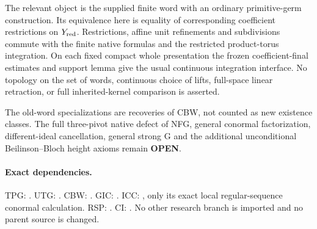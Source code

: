 The relevant object is the supplied finite word with an ordinary
primitive-germ construction.  Its equivalence here is equality
of corresponding coefficient restrictions on $Y_{\rm red}$.
Restrictions, affine unit refinements and subdivisions commute
with the finite native formulas and the restricted product-torus
integration.  On each fixed compact whole presentation the
frozen coefficient-final estimates and support lemma give the
usual continuous integration interface.  No topology on the
set of words, continuous choice of lifts, full-space linear
retraction, or full inherited-kernel comparison is asserted.

The old-word specializations are recoveries of CBW, not counted
as new existence classes.  The full three-pivot native defect
of NFG, general conormal factorization, different-ideal
cancellation, general strong G and the additional unconditional
Beilinson--Bloch height axioms remain \textbf{OPEN}.

\paragraph{Exact dependencies.}
TPG: .
UTG: .
CBW: .
GIC: .
ICC: ,
only its exact local regular-sequence conormal calculation.
RSP: .
CI: .
No other research branch is imported and no parent source is changed.
